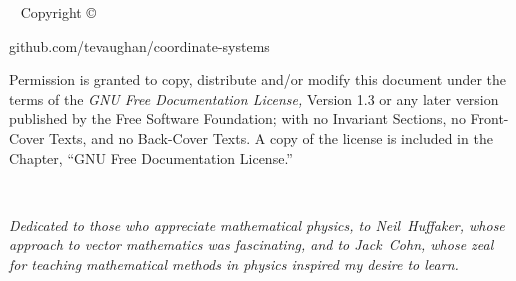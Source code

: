 

\frontmatter

\blankpage

\newpage\thispagestyle{empty}
\vfill
{}

\maketitle

\newpage
\begin{fullwidth}
~\vfill
\thispagestyle{empty}
\setlength{\parindent}{0pt}
\setlength{\parskip}{\baselineskip}
Copyright \copyright\ \the\year\ \thanklessauthor

\par{}

\par{github.com/tevaughan/coordinate-systems}

\par Permission is granted to copy, distribute and/or modify this document
   under the terms of the {\it GNU Free Documentation License,} Version 1.3 or
   any later version published by the Free Software Foundation; with no
   Invariant Sections, no Front-Cover Texts, and no Back-Cover Texts.  A copy
   of the license is included in the Chapter, ``GNU Free Documentation
   License.''

\end{fullwidth}

\tableofcontents

\listoffigures

\listoftables

\cleardoublepage
~\vfill
\begin{doublespace}
\noindent\fontsize{18}{22}\selectfont\itshape
\nohyphenation
Dedicated to those who appreciate mathematical physics, to \mbox{Neil
   Huffaker}, whose approach to vector mathematics was fascinating, and to
   \mbox{Jack Cohn}, whose zeal for teaching mathematical methods in physics
   inspired my desire to learn.
\end{doublespace}
\vfill
\vfill



